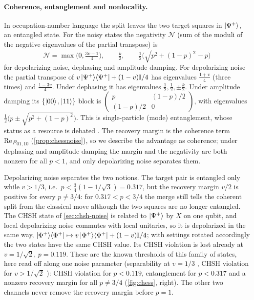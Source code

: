 \documentclass[11pt,a4paper]{article}
\begin{document}
\paragraph{Coherence, entanglement and nonlocality.}
In occupation-number language the split leaves the two target squares in $\ket{\Psi^+}$, an entangled state. For the noisy states the negativity $\mathcal N$ (sum of the moduli of the negative eigenvalues of the partial transpose) is
\[
\mathcal N=\max\big(0,\tfrac{3v-1}4\big),\qquad \tfrac k2,\qquad \tfrac12\Big(\sqrt{p^2+(1-p)^2}-p\Big)
\]
for depolarizing noise, dephasing and amplitude damping. For depolarizing noise the partial transpose of $v\ket{\Psi^+}\!\bra{\Psi^+}+(1-v)\mathbb I/4$ has eigenvalues $\frac{1+v}4$ (three times) and $\frac{1-3v}4$. Under dephasing it has eigenvalues $\frac12,\frac12,\pm\frac k2$. Under amplitude damping its $\{\ket{00},\ket{11}\}$ block is $\begin{pmatrix}p&(1-p)/2\\(1-p)/2&0\end{pmatrix}$, with eigenvalues $\frac12\big(p\pm\sqrt{p^2+(1-p)^2}\big)$. This is single-particle (mode) entanglement, whose status as a resource is debated \cite{vanenk-single}. The recovery margin is the coherence term $\mathrm{Re}\,\rho_{01,10}$ (\cref{prop:chessnoise}), so we describe the advantage as coherence; under dephasing and amplitude damping the margin and the negativity are both nonzero for all $p<1$, and only depolarizing noise separates them.

Depolarizing noise separates the two notions. The target pair is entangled only while $v>1/3$, i.e.\ $p<\frac34(1-1/\sqrt3)=0.317$, but the recovery margin $v/2$ is positive for every $p\ne3/4$: for $0.317<p<3/4$ the merge still tells the coherent split from the classical move although the two squares are no longer entangled. The CHSH state of \cref{sec:chsh-noise} is related to $\ket{\Psi^+}$ by $X$ on one qubit, and local depolarizing noise commutes with local unitaries, so it is depolarized in the same way, $\ket{\Phi^+}\!\bra{\Phi^+}\mapsto v\ket{\Phi^+}\!\bra{\Phi^+}+(1-v)\mathbb I/4$; with settings rotated accordingly the two states have the same CHSH value. Its CHSH violation is lost already at $v=1/\sqrt2$, $p=0.119$. These are the known thresholds of this family of states, here read off along one noise parameter (separability at $v=1/3$ \cite{werner}, CHSH violation for $v>1/\sqrt2$ \cite{horodecki}): CHSH violation for $p<0.119$, entanglement for $p<0.317$ and a nonzero recovery margin for all $p\ne3/4$ (\cref{fig:chess}, right). The other two channels never remove the recovery margin before $p=1$.
\end{document}
